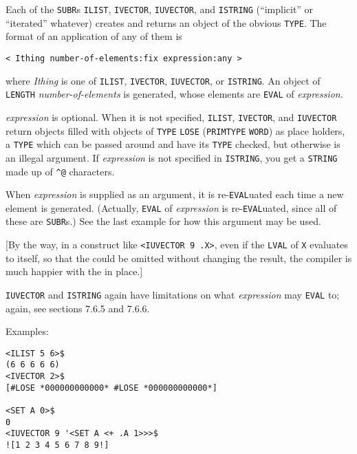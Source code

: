 \documentclass[a4paper,]{article}
\begin{document}
Each of the \texttt{SUBR}s \texttt{ILIST}, \texttt{IVECTOR},
\texttt{IUVECTOR}, and \texttt{ISTRING} (``implicit'' or
``iterated'' whatever) creates and returns an object of the obvious \texttt{TYPE}. The format of an application of any of
them is

\begin{verbatim}
< Ithing number-of-elements:fix expression:any >
\end{verbatim}

where \emph{Ithing} is one of \texttt{ILIST}, \texttt{IVECTOR}, \texttt{IUVECTOR}, or \texttt{ISTRING}. An object of
\texttt{LENGTH} \emph{number-of-elements} is generated, whose elements are \texttt{EVAL} of \emph{expression}.

\emph{expression} is optional. When it is not specified, \texttt{ILIST}, \texttt{IVECTOR}, and \texttt{IUVECTOR} return
objects filled with objects of \texttt{TYPE} \texttt{LOSE} (\texttt{PRIMTYPE} \texttt{WORD}) as place
holders, a \texttt{TYPE} which can be passed around and have its \texttt{TYPE} checked, but otherwise is an illegal
argument. If \emph{expression} is not specified in \texttt{ISTRING}, you get a \texttt{STRING} made up of
\texttt{\^{}@} characters.

When \emph{expression} is supplied as an argument, it is re-\texttt{EVAL}uated each time a new element is generated.
(Actually, \texttt{EVAL} of \emph{expression} is re-\texttt{EVAL}uated, since all of these are \texttt{SUBR}s.) See the
last example for how this argument may be used.

{[}By the way, in a construct like \texttt{\textless{}IUVECTOR\ 9\ \textquotesingle{}.X\textgreater{}}, even if the
\texttt{LVAL} of \texttt{X} evaluates to itself, so that the \texttt{\textquotesingle{}} could be omitted without changing
the result, the compiler is much happier with the \texttt{\textquotesingle{}} in place.{]}

\texttt{IUVECTOR} and \texttt{ISTRING} again have limitations on what \emph{expression} may \texttt{EVAL} to; again, see
sections 7.6.5 and 7.6.6.

Examples:

\begin{verbatim}
<ILIST 5 6>$
(6 6 6 6 6)
<IVECTOR 2>$
[#LOSE *000000000000* #LOSE *000000000000*]

<SET A 0>$
0
<IUVECTOR 9 '<SET A <+ .A 1>>>$
![1 2 3 4 5 6 7 8 9!]
\end{verbatim}
\end{document}
